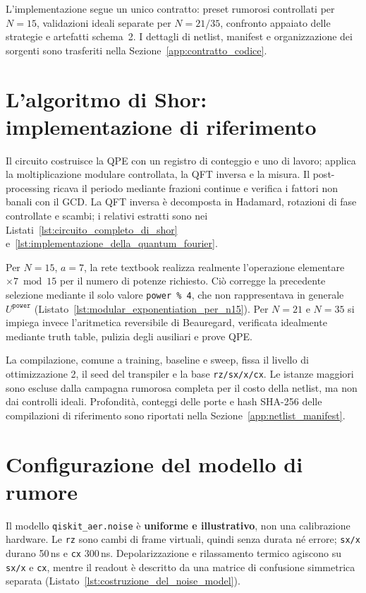 \begin{onehalfspace}

L'implementazione segue un unico contratto: preset rumorosi controllati per $N=15$,
validazioni ideali separate per $N=21/35$, confronto appaiato delle strategie e
artefatti schema~2. I dettagli di netlist, manifest e organizzazione dei sorgenti sono
trasferiti nella Sezione~\ref{app:contratto_codice}.

\section{L'algoritmo di Shor: implementazione di riferimento}
\label{sec:impl_shor}

Il circuito costruisce la \ac{QPE} con un registro di conteggio e uno di lavoro; applica
la moltiplicazione modulare controllata, la \ac{QFT} inversa e la misura. Il
post-processing ricava il periodo mediante frazioni continue e verifica i fattori non
banali con il \ac{GCD}. La QFT inversa è decomposta in Hadamard, rotazioni di fase
controllate e scambi; i relativi estratti sono nei
Listati~\ref{lst:circuito_completo_di_shor}
e~\ref{lst:implementazione_della_quantum_fourier}.

Per $N=15$, $a=7$, la rete textbook realizza realmente l'operazione elementare
$\times7\bmod15$ per il numero di potenze richiesto. Ciò corregge la precedente
selezione mediante il solo valore \texttt{power \% 4}, che non rappresentava in generale
$U^{\texttt{power}}$ (Listato~\ref{lst:modular_exponentiation_per_n15}). Per $N=21$ e
$N=35$ si impiega invece l'aritmetica reversibile di Beauregard, verificata idealmente
mediante truth table, pulizia degli ausiliari e prove QPE.

La compilazione, comune a training, baseline e sweep, fissa il livello di
ottimizzazione 2, il seed del transpiler e la base \texttt{rz/sx/x/cx}. Le
istanze maggiori sono escluse dalla campagna rumorosa completa per il costo della
netlist, ma non dai controlli ideali. Profondità, conteggi delle porte e hash SHA-256
delle compilazioni di riferimento sono riportati nella
Sezione~\ref{app:netlist_manifest}.

\section{Configurazione del modello di rumore}
\label{sec:noise_model}

Il modello \texttt{qiskit\_aer.noise} è \textbf{uniforme e illustrativo}, non una
calibrazione hardware. Le \texttt{rz} sono cambi di frame virtuali, quindi senza durata
né errore; \texttt{sx/x} durano 50\,ns e \texttt{cx} 300\,ns. Depolarizzazione e
rilassamento termico agiscono su \texttt{sx/x} e \texttt{cx}, mentre il readout è
descritto da una matrice di confusione simmetrica separata
(Listato~\ref{lst:costruzione_del_noise_model}).


\end{onehalfspace}
